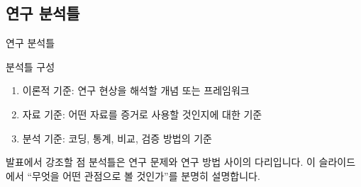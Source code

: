 \subsection{연구 분석틀}
\begin{frame}[t]{연구 분석틀}
\small

\begin{block}{분석틀 구성}
\begin{enumerate}
\tightitems

\item 이론적 기준: 연구 현상을 해석할 개념 또는 프레임워크
\item 자료 기준: 어떤 자료를 증거로 사용할 것인지에 대한 기준
\item 분석 기준: 코딩, 통계, 비교, 검증 방법의 기준
\end{enumerate}
\end{block}

\begin{exampleblock}{발표에서 강조할 점}
분석틀은 연구 문제와 연구 방법 사이의 다리입니다. 이 슬라이드에서 ``무엇을 어떤 관점으로 볼 것인가''를 분명히 설명합니다.
\end{exampleblock}

\end{frame}
